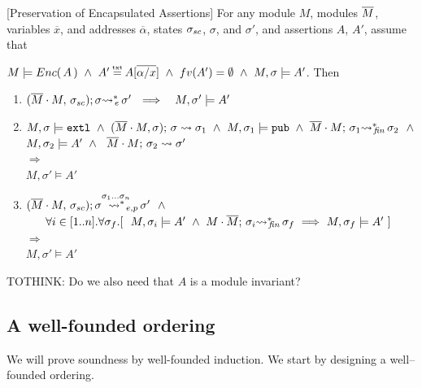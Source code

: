 \begin{auxLemma}
\label{lemma:external_exec_preserves_more}[Preservation of Encapsulated Assertions]
For any module $M$, modules $\overline{M}$, variables $\overline x$, and addresses $\overline \alpha$,
 states $\sigma_{sc}$, $\sigma$, and $\sigma'$, and assertions $A$, $A'$, 
assume that

\noindent
 $M \models \encaps A \   \wedge  \ A'\txteq A[\overline{\alpha/x}]\  \wedge \ fv(A')=\emptyset \  \wedge \ 
M, \sigma \models  A' $. Then

\begin{enumerate}

\item
$   (\overline{M}\cdot M,\, {\sigma_{sc}}); \sigma{\rightsquigarrow^*}\!\!_{e}\, \sigma' 
\ \ \Longrightarrow \ \ \ M, \sigma' \models A'$

\item
$M, \sigma  \models \mbox{\normalfont{\texttt{extl}}} \ \wedge \  (\overline{M}\cdot M, \sigma);\, {\sigma} \rightsquigarrow \sigma_{1} \ \wedge
 \ M, \sigma_1 \models \mbox{\normalfont{\texttt{pub}}} \ \wedge\  \overline{M}\cdot M;\, {\sigma_1} {\rightsquigarrow^*}\!\!_{\mathit{fin}}\, \sigma_2    \ \ \wedge$\\
$ M, \sigma_2 \models A' \ \wedge \ 
  \   \leadstoBounded  {\Mtwo\cdot M} {\sigma_2}      {\sigma'}$\\
 $\Longrightarrow $
\\
$M, \sigma' \models A' $

\item
$ \WithExtPub {\Mtwo\cdot M} {\sigma\bd}  {\sigma}  {\sigma'} {\sigma_1...\sigma_n}\ \ \wedge $\\
 $\strut \ \ \ \  \  \forall i\in [1..n]. \forall \sigma_{f}.[ \ \  M, \sigma_i \models A'  \ \wedge \  \leadstoBoundedStarFin {M\cdot \Mtwo}  {\sigma_i}  {\sigma_{f}} \ 
\Longrightarrow \  M, \sigma_f \models A' \ ]$\\
$\Longrightarrow $
\\
$M, \sigma' \models A' $
\end{enumerate}

TOTHINK: Do we also need that $A$ is a module invariant?
\end{auxLemma}




\subsection{A well-founded ordering}
\label{sect:prove:wellfounded}

We will prove soundness by well-founded induction.
We start by designing a well--founded ordering. 



